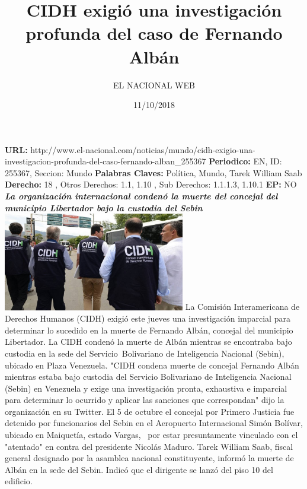 \documentclass{article}%
\title{\textbf{CIDH exigió una investigación profunda del caso de Fernando Albán}}%
\author{EL NACIONAL WEB}%
\date{11/10/2018}%
\begin{document}
%
\normalsize%
\maketitle%
\textbf{URL: }%
http://www.el{-}nacional.com/noticias/mundo/cidh{-}exigio{-}una{-}investigacion{-}profunda{-}del{-}caso{-}fernando{-}alban\_255367\newline%
%
\textbf{Periodico: }%
EN, %
ID: %
255367, %
Seccion: %
Mundo\newline%
%
\textbf{Palabras Claves: }%
Política, Mundo, Tarek William Saab\newline%
%
\textbf{Derecho: }%
18%
, Otros Derechos: %
1.1, 1.10%
, Sub Derechos: %
1.1.1.3, 1.10.1%
\newline%
%
\textbf{EP: }%
NO\newline%
\newline%
%
\textbf{\textit{La organización internacional condenó la muerte del concejal del municipio Libertador bajo la custodia del Sebin}}%
\newline%
\newline%
%
\includegraphics[width=300px]{213.jpg}%
\newline%
%
La Comisión Interamericana de Derechos Humanos (CIDH) exigió este jueves una investigación imparcial para determinar lo sucedido en la muerte de Fernando Albán, concejal del municipio Libertador.%
\newline%
%
La CIDH condenó la muerte de Albán mientras se encontraba bajo custodia en la sede del Servicio~Bolivariano de Inteligencia Nacional (Sebin), ubicado en Plaza Venezuela.%
\newline%
%
"CIDH condena muerte de concejal Fernando Albán mientras estaba bajo custodia del Servicio Bolivariano de Inteligencia Nacional (Sebin) en Venezuela y exige una investigación pronta, exhaustiva e imparcial para determinar lo ocurrido y aplicar las sanciones que correspondan" dijo la organización en su Twitter.%
\newline%
%
El 5 de octubre el concejal por Primero Justicia fue detenido por funcionarios del Sebin en el Aeropuerto Internacional Simón Bolívar, ubicado en Maiquetía, estado Vargas,~ por estar presuntamente vinculado con el "atentado" en contra del presidente Nicolás Maduro.%
\newline%
%
Tarek William Saab, fiscal general designado por la asamblea nacional constituyente, informó la muerte de Albán en la sede del Sebin. Indicó que el dirigente se lanzó del piso 10 del edificio.%
\newline%
%
\end{document}
